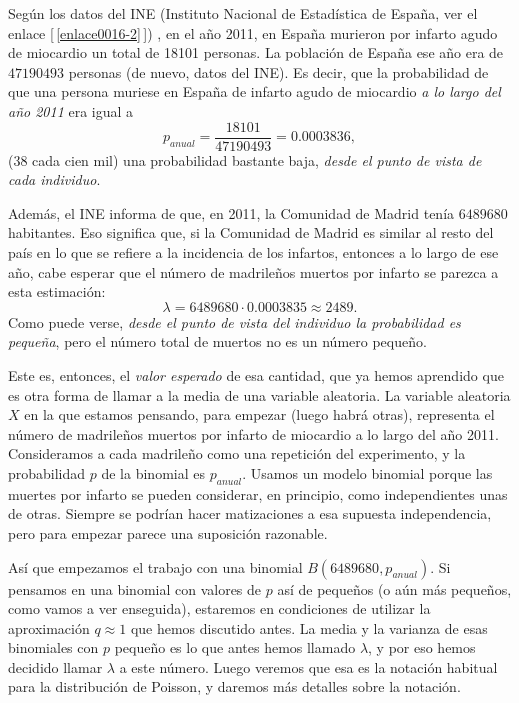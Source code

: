\begin{ejemplo}\label{cap08:ejem:PoissonMuertesInfarto01}
Según los datos del INE (Instituto Nacional de Estadística de España, ver el enlace [\,\ref{enlace0016-2}\,]\label{enlace0016a-2}) , en el año 2011, en España murieron por
infarto agudo de miocardio un total de 18101 personas. La población de España ese año era de
$47190493$ personas (de nuevo, datos del INE). Es decir, que la probabilidad de que una persona muriese en España de infarto
agudo de miocardio {\em a lo largo del año 2011} era igual a
\[p_{anual}=\dfrac{18101}{47190493}=0.0003836,\]
(38 cada cien mil) una probabilidad bastante baja, {\em desde el punto de vista de cada individuo}.

Además, el INE informa de que, en
2011, la Comunidad de Madrid tenía $6489680$ habitantes. Eso significa que, si la Comunidad de
Madrid es similar al resto del país en lo que se refiere a la incidencia de los infartos, entonces
a lo largo de ese año, cabe esperar que el número de  madrileños muertos por infarto se parezca a
esta estimación:
\[\lambda=6489680\cdot 0.0003835\approx 2489.\]
Como puede verse, {\em desde el punto de vista del individuo la probabilidad es pequeña}, pero el
número total de muertos no es un número pequeño.

Este es, entonces, el {\em valor esperado} de esa cantidad, que ya hemos aprendido que es otra
forma de llamar a la media de una variable aleatoria.  La variable aleatoria $X$ en la que estamos
pensando, para empezar (luego habrá otras), representa el número de madrileños muertos por infarto
de miocardio a lo largo del año 2011. Consideramos a cada madrileño como una repetición del
experimento, y la probabilidad $p$ de la binomial es $p_{anual}$. Usamos un modelo binomial porque
las muertes por infarto se pueden considerar, en principio, como independientes unas de otras.
Siempre se podrían hacer matizaciones a esa supuesta independencia, pero para empezar parece una
suposición razonable.

Así que empezamos el trabajo con una binomial $B(6489680, p_{anual})$.  Si pensamos en una binomial
con valores de $p$ así de pequeños (o aún más pequeños, como vamos a ver enseguida), estaremos en
condiciones de utilizar la aproximación $q\approx 1$ que hemos discutido antes. La media y la
varianza de esas binomiales con $p$ pequeño es lo que antes hemos llamado $\lambda$, y por eso
hemos decidido llamar $\lambda$ a este número. Luego veremos que esa es la notación habitual para
la distribución de Poisson, y daremos más detalles sobre la notación.


\end{ejemplo}
